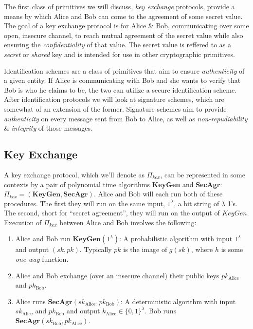 The first class of primitives we will discuss, \emph{key exchange} protocols, provide a means by which Alice and Bob can come to the agreement of some secret value. The goal of a key exchange protocol is for Alice \& Bob, communicating over some open, insecure channel, to reach mutual agreement of the secret value while also ensuring the \emph{confidentiality} of that value. The secret value is reffered to as a \emph{secret} or \emph{shared} key and is intended for use in other cryptographic primitives. 

Identification schemes are a class of primitives that aim to ensure \emph{authenticity} of a given entity. If Alice is communicating with Bob and she wants to verify that Bob is who he claims to be, the two can utilize a secure identification scheme. After identification protocols we will look at signature schemes, which are somewhat of an extension of the former. Signature schemes aim to provide \emph{authenticity} on every message sent from Bob to Alice, as well as \emph{non-repudiability} \& \emph{integrity} of those messages.\\

\subsection{Key Exchange}

A key exchange protocol, which we'll denote as $\Pi_{kex}$, can be represented in some contexts by a pair of polynomial time algorithms \textbf{KeyGen} and \textbf{SecAgr}: $\Pi_{kex} = (\textbf{KeyGen},\textbf{SecAgr})$. Alice and Bob will each run both of these procedures. The first they will run on the same input, $1^\lambda$, a bit string of $\lambda$ 1's. The second, short for ``secret agreement'', they will run on the output of $KeyGen$.\\

Execution of $\Pi_{kex}$ between Alice and Bob involves the following:
\begin{enumerate}[label=(\roman*)]
\item Alice and Bob run $\textbf{KeyGen}(1^\lambda)$: A probabilistic algorithm with input $1^\lambda$ and output $(sk,pk)$. Typically $pk$ is the image of $g(sk)$, where $h$ is some \emph{one-way} function.
\item Alice and Bob exchange (over an insecure channel) their public keys $pk_{\text{Alice}}$ and $pk_{\text{Bob}}$.
\item Alice runs $\textbf{SecAgr}(sk_{\text{Alice}}, pk_{\text{Bob}})$: A deterministic algorithm with input $sk_{\text{Alice}}$ and $pk_{\text{Bob}}$ and output $k_{\text{Alice}} \in \{0,1\}^\lambda$. Bob runs $\textbf{SecAgr}(sk_{\text{Bob}}, pk_{\text{Alice}})$.
\end{enumerate}

